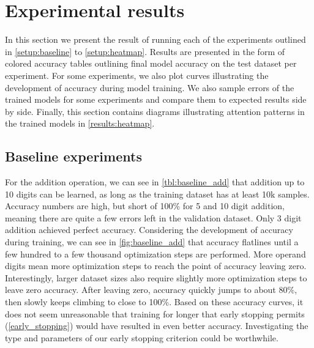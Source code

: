 \section{Experimental results}

In this section we present the result of running each of the experiments outlined in \cref{setup:baseline} to \cref{setup:heatmap}. Results are presented in the form of colored accuracy tables outlining final model accuracy on the test dataset per experiment.
For some experiments, we also plot curves illustrating the development of accuracy during model training.
We also sample errors of the trained models for some experiments and compare them to expected results side by side.
Finally, this section contains diagrams illustrating attention patterns in the trained models in \cref{results:heatmap}.

\subsection{Baseline experiments}
\label{results:baseline}

For the addition operation, we can see in \cref{tbl:baseline_add} that addition up to 10 digits can be learned, as long as the training dataset has at least 10k samples. Accuracy numbers are high, but short of 100\% for 5 and 10 digit addition, meaning there are quite a few errors left in the validation dataset. Only 3 digit addition achieved perfect accuracy.
Considering the development of accuracy during training, we can see in \cref{fig:baseline_add} that accuracy flatlines until a few hundred to a few thousand optimization steps are performed. More operand digits mean more optimization steps to reach the point of accuracy leaving zero. Interestingly, larger dataset sizes also require slightly more optimization steps to leave zero accuracy.
After leaving zero, accuracy quickly jumps to about 80\%, then slowly keeps climbing to close to 100\%.
Based on these accuracy curves, it does not seem unreasonable that training for longer that early stopping permits (\cref{early_stopping}) would have resulted in even better accuracy. Investigating the type and parameters of our early stopping criterion could be worthwhile.


